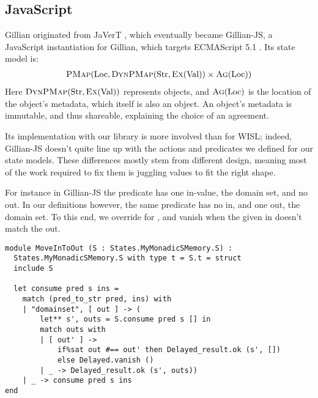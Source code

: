 \subsection{JavaScript}

Gillian originated from JaVerT \cite{javert1,javert2}, which eventually became Gillian-JS, a JavaScript instantiation for Gillian, which targets ECMAScript 5.1 \cite{ecmascript}. Its state model is: \begin{align*}
	\textsc{PMap}(\text{Loc}, \textsc{DynPMap}(\text{Str}, \textsc{Ex}(\text{Val})) \times \textsc{Ag}(\text{Loc}))
\end{align*}
Here $\textsc{DynPMap}(\text{Str}, \textsc{Ex}(\text{Val}))$ represents objects, and $\textsc{Ag}(\text{Loc})$ is the location of the object's metadata, which itself is also an object. An object's metadata is immutable, and thus shareable, explaining the choice of an agreement.

Its implementation with our library is more involved than for WISL; indeed, Gillian-JS doesn't quite line up with the actions and predicates we defined for our state models. These differences mostly stem from different design, meaning most of the work required to fix them is juggling values to fit the right shape.

For instance in Gillian-JS the \domainset{} predicate has one in-value, the domain set, and no out. In our definitions however, the same predicate has no in, and one out, the domain set. To this end, we override \consume{} for \domainset{}, and vanish when the given in doesn't match the out.
\begin{lstlisting}
module MoveInToOut (S : States.MyMonadicSMemory.S) :
  States.MyMonadicSMemory.S with type t = S.t = struct
  include S

  let consume pred s ins =
    match (pred_to_str pred, ins) with
    | "domainset", [ out ] -> (
        let** s', outs = S.consume pred s [] in
        match outs with
        | [ out' ] ->
            if%sat out #== out' then Delayed_result.ok (s', [])
            else Delayed.vanish ()
        | _ -> Delayed_result.ok (s', outs))
    | _ -> consume pred s ins
end
\end{lstlisting}

